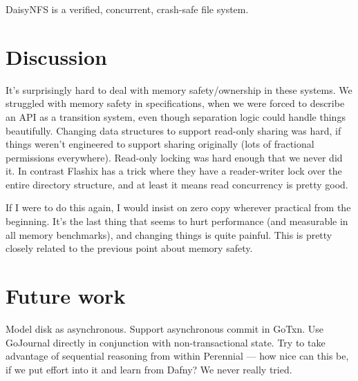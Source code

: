 DaisyNFS is a verified, concurrent, crash-safe file system.

\section{Discussion}

It's surprisingly hard to deal with memory safety/ownership in these systems. We
struggled with memory safety in specifications, when we were forced to describe
an API as a transition system, even though separation logic could handle things
beautifully. Changing data structures to support read-only sharing was hard, if
things weren't engineered to support sharing originally (lots of fractional
permissions everywhere). Read-only locking was hard enough that we never did it.
In contrast Flashix has a trick where they have a reader-writer lock over the
entire directory structure, and at least it means read concurrency is pretty
good.

If I were to do this again, I would insist on zero copy wherever practical from
the beginning. It's the last thing that seems to hurt performance (and
measurable in all memory benchmarks), and changing things is quite painful. This
is pretty closely related to the previous point about memory safety.

\section{Future work}

Model disk as asynchronous. Support asynchronous commit in GoTxn.  Use GoJournal
directly in conjunction with non-transactional state. Try to take advantage of
sequential reasoning from within Perennial --- how nice can this be, if we put
effort into it and learn from Dafny? We never really tried.
